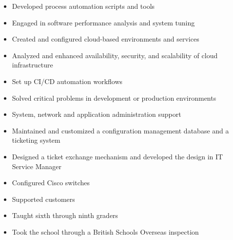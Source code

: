 \documentclass[10pt,a4paper,ragged2e,withhyper]{altacv}
\begin{document}
\newpage

\begin{itemize}
\item Developed process automation scripts and tools
\item Engaged in software performance analysis and system tuning
\item Created and configured cloud-based environments and services
\item Analyzed and enhanced availability, security, and scalability of cloud infrastructure
\item Set up CI/CD automation workflows
\item Solved critical problems in development or production environments
\item System, network and application administration support
\end{itemize}
\divider

\begin{itemize}
\item Maintained and customized a configuration management database and a ticketing system
\item Designed a ticket exchange mechanism and developed the design in IT Service Manager
\end{itemize}
\divider

\begin{itemize}
\item Configured Cisco switches
\item Supported customers
\end{itemize}
\divider

\begin{itemize}
\item Taught sixth through ninth graders
\item Took the school through a British Schools Overseas inspection
\end{itemize}

\bigskip
\end{document}
